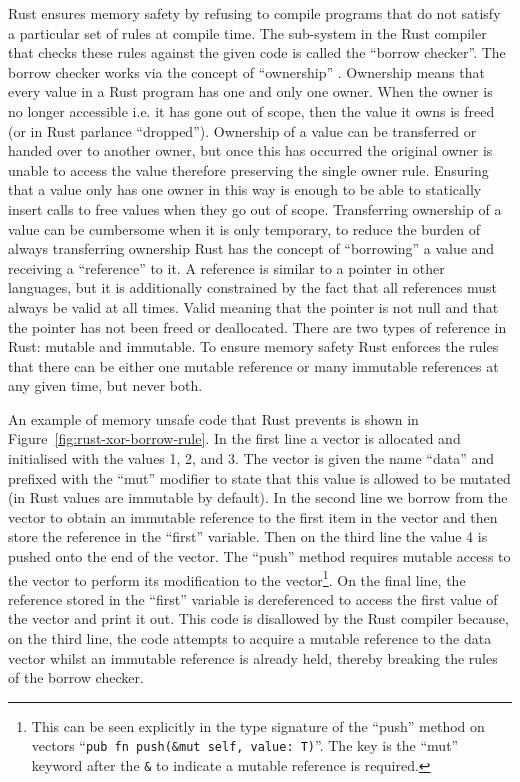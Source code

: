 Rust ensures memory safety by refusing to compile programs that do not satisfy
a particular set of rules at compile time. The sub-system in the Rust compiler
that checks these rules against the given code is called the ``borrow
checker''. The borrow checker works via the concept of ``ownership''
\cite{rust-book-ownership}. Ownership means that every value in a Rust program
has one and only one owner. When the owner is no longer accessible i.e. it has
gone out of scope, then the value it owns is freed (or in Rust parlance
``dropped''). Ownership of a value can be transferred or handed over to another
owner, but once this has occurred the original owner is unable to access the
value therefore preserving the single owner rule. Ensuring that a value only
has one owner in this way is enough to be able to statically insert calls to
free values when they go out of scope. Transferring ownership of a value can be
cumbersome when it is only temporary, to reduce the burden of always
transferring ownership Rust has the concept of ``borrowing'' a value and
receiving a ``reference'' to it. A reference is similar to a pointer in other
languages, but it is additionally constrained by the fact that all references
must always be valid at all times. Valid meaning that the pointer is not null
and that the pointer has not been freed or deallocated. There are two types of
reference in Rust: mutable and immutable. To ensure memory safety Rust enforces
the rules that there can be either one mutable reference or many immutable
references at any given time, but never both.

An example of memory unsafe code that Rust prevents is shown in
Figure~\ref{fig:rust-xor-borrow-rule}. In the first line a vector is allocated
and initialised with the values 1, 2, and 3. The vector is given the name
``data'' and prefixed with the ``mut'' modifier to state that this value is
allowed to be mutated (in Rust values are immutable by default). In the second
line we borrow from the vector to obtain an immutable reference to the first
item in the vector and then store the reference in the ``first'' variable. Then
on the third line the value 4 is pushed onto the end of the vector. The
``push'' method requires mutable access to the vector to perform its
modification to the vector\footnote{This can be seen explicitly in the type
signature of the ``push'' method on vectors ``\texttt{pub fn push(\&mut self,
value: T)}''. The key is the ``mut'' keyword after the \texttt{\&} to indicate
a mutable reference is required.}. On the final line, the reference stored in
the ``first'' variable is dereferenced to access the first value of the vector
and print it out. This code is disallowed by the Rust compiler because, on the
third line, the code attempts to acquire a mutable reference to the data vector
whilst an immutable reference is already held, thereby breaking the rules of
the borrow checker.

